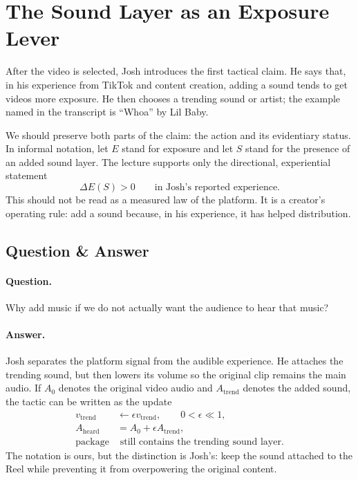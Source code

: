 \section{The Sound Layer as an Exposure Lever}

After the video is selected, Josh introduces the first tactical claim. He says that, in his experience from TikTok and content creation, adding a sound tends to get videos more exposure. He then chooses a trending sound or artist; the example named in the transcript is ``Whoa'' by Lil Baby.

We should preserve both parts of the claim: the action and its evidentiary status. In informal notation, let \(E\) stand for exposure and let \(S\) stand for the presence of an added sound layer. The lecture supports only the directional, experiential statement
\begin{equation}
\Delta E(S) > 0
\qquad
\text{in Josh's reported experience.}
\end{equation}
This should not be read as a measured law of the platform. It is a creator's operating rule: add a sound because, in his experience, it has helped distribution.

\subsection{Question \& Answer}

\paragraph{Question.}
Why add music if we do not actually want the audience to hear that music?

\paragraph{Answer.}
Josh separates the platform signal from the audible experience. He attaches the trending sound, but then lowers its volume so the original clip remains the main audio. If \(A_0\) denotes the original video audio and \(A_{\mathrm{trend}}\) denotes the added sound, the tactic can be written as the update
\begin{align}
v_{\mathrm{trend}} &\longleftarrow \epsilon v_{\mathrm{trend}},
\qquad 0<\epsilon\ll 1, \\
A_{\mathrm{heard}} &= A_0 + \epsilon A_{\mathrm{trend}}, \\
\mathrm{package} &\text{ still contains the trending sound layer.}
\end{align}
The notation is ours, but the distinction is Josh's: keep the sound attached to the Reel while preventing it from overpowering the original content.

